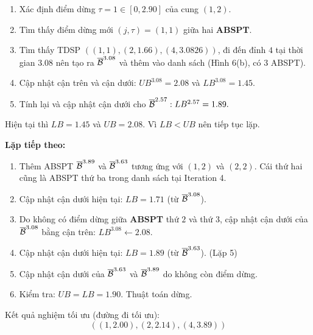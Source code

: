 \documentclass[../main.tex]{subfiles}
\begin{document}
\begin{enumerate}
\def\labelenumi{\arabic{enumi}.}
\tightlist
\item
  Xác định điểm dừng \(\tau = 1 \in [0, 2.90]\) của cung \((1, 2)\).
\item
  Tìm thấy điểm dừng mới \((j, \tau) = (1, 1)\) giữa hai \textbf{ABSPT}.
\item
  Tìm thấy TDSP \(((1, 1), (2, 1.66), (4, 3.0826))\), đi đến đỉnh \(4\)
  tại thời gian \(3.08\) nên tạo ra \(\overline{\cal B}^{3.08}\) và thêm
  vào danh sách (Hình 6(b), có 3 ABSPT).
\item
  Cập nhật cận trên và cận dưới: \(UB^{3.08} = 2.08\) và
  \(LB^{3.08} = 1.45\).
\item
  Tính lại và cập nhật cận dưới cho
  \(\overline{\cal B}^{2.57} : LB^{2.57} = 1.89.\)
\end{enumerate}

Hiện tại thì \(LB=1.45\) và \(UB = 2.08\). Vì \(LB<UB\) nên tiếp tục
lặp.

\textbf{Lặp tiếp theo:}

\begin{enumerate}
\def\labelenumi{\arabic{enumi}.}
\tightlist
\item
  Thêm ABSPT \(\overline{\cal B}^{3.89}\) và
  \(\overline{\cal B}^{3.63}\) tương ứng với \((1, 2)\) và \((2, 2)\).
  Cái thứ hai cũng là ABSPT thứ ba trong danh sách tại Iteration 4.
\item
  Cập nhật cận dưới hiện tại: \(LB = 1.71\) (từ
  \(\overline{\cal B}^{3.08}\)).
\item
  Do không có điểm dừng giữa \textbf{ABSPT} thứ \(2\) và thứ \(3\), cập
  nhật cận dưới của \(\overline{\cal B}^{3.08}\) bằng cận trên:
  \(LB^{3.08} \gets 2.08\).
\item
  Cập nhật cận dưới hiện tại: \(LB = 1.89\) (từ
  \(\overline{\cal B}^{3.63}\)). (Lặp 5)
\item
  Cập nhật cận dưới của \(\overline{\cal B}^{3.63}\) và
  \(\overline{\cal B}^{3.89}\) do không còn điểm dừng.
\item
  Kiểm tra: \(UB = LB = 1.90\). Thuật toán dừng.
\end{enumerate}

Kết quả nghiệm tối ưu (đường đi tối ưu):
\[((1, 2.00), (2, 2.14), (4, 3.89))\]
\backmatter
\end{document}
